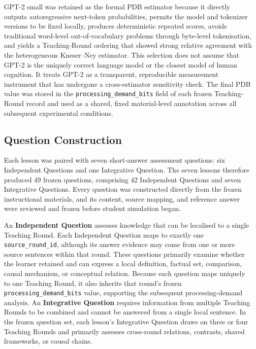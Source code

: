 GPT-2 small was retained as the formal PDB estimator because it directly outputs autoregressive next-token probabilities, permits the model and tokenizer versions to be fixed locally, produces deterministic repeated scores, avoids traditional word-level out-of-vocabulary problems through byte-level tokenisation, and yields a Teaching-Round ordering that showed strong relative agreement with the heterogeneous Kneser--Ney estimator. This selection does not assume that GPT-2 is the uniquely correct language model or the closest model of human cognition. It treats GPT-2 as a transparent, reproducible measurement instrument that has undergone a cross-estimator sensitivity check. The final PDB value was stored in the \texttt{processing\_demand\_bits} field of each frozen Teaching-Round record and used as a shared, fixed material-level annotation across all subsequent experimental conditions.

\subsection{Question Construction}
\label{subsec:question-construction}

Each lesson was paired with seven short-answer assessment questions: six Independent Questions and one Integrative Question. The seven lessons therefore produced 49 frozen questions, comprising 42 Independent Questions and seven Integrative Questions. Every question was constructed directly from the frozen instructional materials, and its content, source mapping, and reference answer were reviewed and frozen before student simulation began.

An \textbf{Independent Question} assesses knowledge that can be localised to a single Teaching Round. Each Independent Question maps to exactly one \texttt{source\_round\_id}, although its answer evidence may come from one or more source sentences within that round. These questions primarily examine whether the learner retained and can express a local definition, factual set, comparison, causal mechanism, or conceptual relation. Because each question maps uniquely to one Teaching Round, it also inherits that round's frozen \texttt{processing\_demand\_bits} value, supporting the subsequent processing-demand analysis. An \textbf{Integrative Question} requires information from multiple Teaching Rounds to be combined and cannot be answered from a single local sentence. In the frozen question set, each lesson's Integrative Question draws on three or four Teaching Rounds and primarily assesses cross-round relations, contrasts, shared frameworks, or causal chains.

